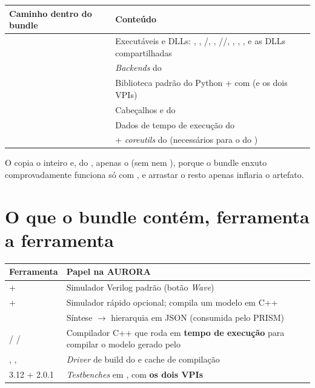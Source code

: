 \begin{tabularx}{\linewidth}{Y Z}
\toprule
\textbf{Caminho dentro do bundle} & \textbf{Conteúdo} \\
\midrule
{} & Executáveis e DLLs: , , /, , //, , , ,  e as DLLs compartilhadas \\
 & \emph{Backends} do  \\
 & Biblioteca padrão do Python +  com  (e os dois VPIs) \\
 & Cabeçalhos e  do  \\
 & Dados de tempo de execução do  \\
 &  + \emph{coreutils} do  (necessários para o  do ) \\
\bottomrule
\end{tabularx}

\medskip

O  copia o  inteiro e, do
, apenas o  (sem  nem ),
porque o bundle enxuto comprovadamente funciona só com , e arrastar
o resto apenas inflaria o artefato.

\section{O que o bundle contém, ferramenta a ferramenta}

\begin{tabularx}{\linewidth}{Y Z}
\toprule
\textbf{Ferramenta} & \textbf{Papel na AURORA} \\
\midrule
{} +  & Simulador Verilog padrão (botão \emph{Wave}) \\
 +  & Simulador rápido opcional; compila um modelo em C++ \\
 & Síntese $\rightarrow$ hierarquia em JSON (consumida pelo PRISM) \\
 /  /  & Compilador C++ que roda em \textbf{tempo de execução} para compilar o modelo gerado pelo  \\
, ,  & \emph{Driver} de build do  e cache de compilação \\
 3.12 +  2.0.1 & \emph{Testbenches} em , com \textbf{os dois VPIs} \\
\bottomrule
\end{tabularx}

